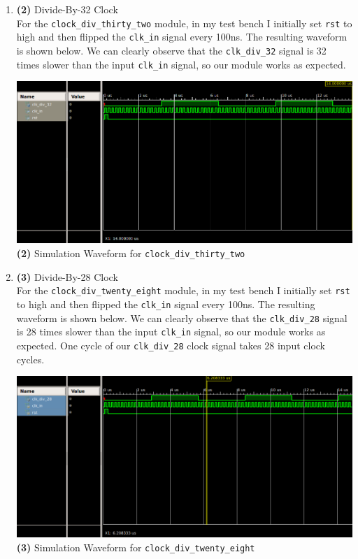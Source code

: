 \documentclass{article}
\begin{document}
\begin{enumerate}
    \item \textbf{(2)} Divide-By-32 Clock \\
    For the \texttt{clock\_div\_thirty\_two} module, in my test bench I initially set \texttt{rst} to high and then flipped the \texttt{clk\_in} signal every 100ns. The resulting waveform is shown below. We can clearly observe that the \texttt{clk\_div\_32} signal is 32 times slower than the input \texttt{clk\_in} signal, so our module works as expected.
    \begin{center}
        \includegraphics[scale=0.4]{waveform-2.png} \\
        \caption{\textbf{(2)} Simulation Waveform for \texttt{clock\_div\_thirty\_two}}
    \end{center}  \par

    \item \textbf{(3)} Divide-By-28 Clock  \\
    For the \texttt{clock\_div\_twenty\_eight} module, in my test bench I initially set \texttt{rst} to high and then flipped the \texttt{clk\_in} signal every 100ns. The resulting waveform is shown below. We can clearly observe that the \texttt{clk\_div\_28} signal is 28 times slower than the input \texttt{clk\_in} signal, so our module works as expected. One cycle of our \texttt{clk\_div\_28} clock signal takes 28 input clock cycles.
    \begin{center}
        \includegraphics[scale=0.4]{waveform-3.png} \\
        \caption{\textbf{(3)} Simulation Waveform for \texttt{clock\_div\_twenty\_eight}}
    \end{center}
    \par
    

\end{enumerate}
\end{document}
